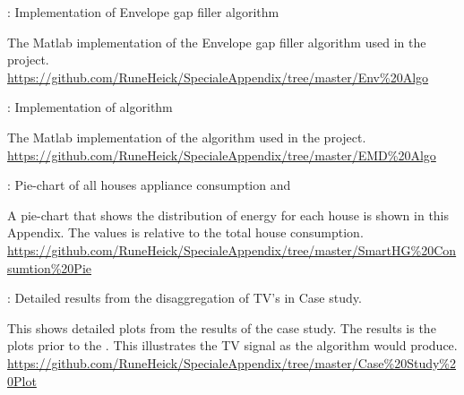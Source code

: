  : Implementation of Envelope gap filler algorithm
\begin{adjustwidth}{2.5em}{0.0em}
The Matlab implementation of the Envelope gap filler algorithm used in the project.\\
\url{https://github.com/RuneHeick/SpecialeAppendix/tree/master/Env\%20Algo}
\end{adjustwidth}

 : Implementation of  algorithm
\begin{adjustwidth}{2.5em}{0.0em}
The Matlab implementation of the  algorithm used in the project. \\
\url{https://github.com/RuneHeick/SpecialeAppendix/tree/master/EMD\%20Algo}
\end{adjustwidth}

 : Pie-chart of all houses appliance consumption and 
\begin{addmargin}[2.5em]{0.0em}
A pie-chart that shows the distribution of energy for each house is shown in this Appendix. The values is relative to the total house consumption.\\
\url{https://github.com/RuneHeick/SpecialeAppendix/tree/master/SmartHG\%20Consumtion\%20Pie}
\end{addmargin}

 : Detailed results from the disaggregation of TV's in Case study. 
\begin{adjustwidth}{2.5em}{0.0em}
This shows detailed plots from the results of the case study. The results is the plots prior to the . This illustrates the TV signal as the  algorithm would produce. \\
\url{https://github.com/RuneHeick/SpecialeAppendix/tree/master/Case\%20Study\%20Plot}
\end{adjustwidth}
